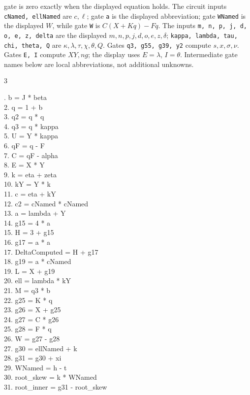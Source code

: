 \documentclass[10pt]{article}
\begin{document}
gate is zero exactly when the displayed equation holds. The circuit inputs
\texttt{cNamed, ellNamed} are $c,\ell$; gate \texttt{a} is the displayed abbreviation; gate \texttt{WNamed} is the
displayed $W$, while gate \texttt{W} is $C(X+Kq)-Fq$. The inputs
\texttt{m, n, p, j, d, o, e, z, delta} are the displayed
$m,n,p,j,d,o,e,z,\delta$; \texttt{kappa, lambda, tau, chi, theta, Q}
are $\kappa,\lambda,\tau,\chi,\theta,Q$. Gates \texttt{q3, g55, g39, y2} compute $s,x,\sigma,\nu$. Gates \texttt{E, I} compute
$XY,ng$; the display uses $E=\lambda$, $I=\theta$. Intermediate gate
names below are local abbreviations, not additional unknowns.
\begin{multicols}{3}
\raggedright\ttfamily\fontsize{7.2}{8.4}. b = J * beta\\
2. q = 1 + b\\
3. q2 = q * q\\
4. q3 = q * kappa\\
5. U = Y * kappa\\
6. qF = q - F\\
7. C = qF - alpha\\
8. E = X * Y\\
9. k = eta + zeta\\
10. kY = Y * k\\
11. c = eta + kY\\
12. c2 = cNamed * cNamed\\
13. a = lambda + Y\\
14. g15 = 4 * a\\
15. H = 3 + g15\\
16. g17 = a * a\\
17. DeltaComputed = H + g17\\
18. g19 = a * cNamed\\
19. L = X + g19\\
20. ell = lambda * kY\\
21. M = q3 * b\\
22. g25 = K * q\\
23. g26 = X + g25\\
24. g27 = C * g26\\
25. g28 = F * q\\
26. W = g27 - g28\\
27. g30 = ellNamed + k\\
28. g31 = g30 + xi\\
29. WNamed = h - t\\
30. root\_skew = k * WNamed\\
31. root\_inner = g31 - root\_skew\\

\end{multicols}
\end{document}
